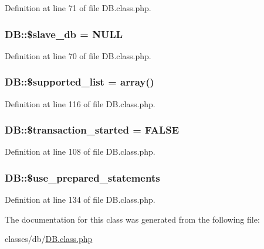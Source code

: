 Definition at line 71 of file D\+B.\+class.\+php.

\hypertarget{classDB_a0a811a4446882ee9edf0ed846e8926f3}{}
\subsubsection[{\$slave\+\_\+db}]{\setlength{\rightskip}{0pt plus 5cm}D\+B\+::\$slave\+\_\+db = N\+U\+L\+L}\label{classDB_a0a811a4446882ee9edf0ed846e8926f3}


Definition at line 70 of file D\+B.\+class.\+php.

\hypertarget{classDB_ac09dd547a22963632e063c9ab68b7707}{}
\subsubsection[{\$supported\+\_\+list}]{\setlength{\rightskip}{0pt plus 5cm}D\+B\+::\$supported\+\_\+list = array()}\label{classDB_ac09dd547a22963632e063c9ab68b7707}


Definition at line 116 of file D\+B.\+class.\+php.

\hypertarget{classDB_a39a0eef56f82082ca4c69bcad1f12a31}{}
\subsubsection[{\$transaction\+\_\+started}]{\setlength{\rightskip}{0pt plus 5cm}D\+B\+::\$transaction\+\_\+started = F\+A\+L\+S\+E}\label{classDB_a39a0eef56f82082ca4c69bcad1f12a31}


Definition at line 108 of file D\+B.\+class.\+php.

\hypertarget{classDB_a9902aee7d8900a597670fce92c7eb74b}{}
\subsubsection[{\$use\+\_\+prepared\+\_\+statements}]{\setlength{\rightskip}{0pt plus 5cm}D\+B\+::\$use\+\_\+prepared\+\_\+statements}\label{classDB_a9902aee7d8900a597670fce92c7eb74b}


Definition at line 134 of file D\+B.\+class.\+php.



The documentation for this class was generated from the following file\+:\begin{DoxyCompactItemize}
\item 
classes/db/\hyperlink{DB_8class_8php}{D\+B.\+class.\+php}\end{DoxyCompactItemize}
